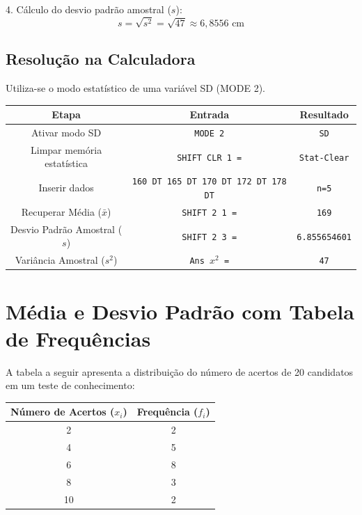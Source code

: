 4. Cálculo do desvio padrão amostral ($s$):
\[
s = \sqrt{s^2} = \sqrt{47} \approx 6{,}8556 \text{ cm}
\]

\subsection*{Resolução na Calculadora}

Utiliza-se o modo estatístico de uma variável SD (MODE 2).

\begin{table}[H]
    \centering
    \begin{tabular}{|c|c|c|}
        \hline
        \textbf{Etapa} & \textbf{Entrada} & \textbf{Resultado} \\ \hline
        Ativar modo SD & \texttt{MODE 2} & \texttt{SD} \\
        Limpar memória estatística & \texttt{SHIFT CLR 1 =} & \texttt{Stat-Clear} \\
        Inserir dados & \texttt{160 DT 165 DT 170 DT 172 DT 178 DT} & \texttt{n=5} \\
        Recuperar Média ($\bar{x}$) & \texttt{SHIFT 2 1 =} & \texttt{169} \\
        Desvio Padrão Amostral ($s$) & \texttt{SHIFT 2 3 =} & \texttt{6.855654601} \\
        Variância Amostral ($s^2$) & \texttt{Ans $x^2$ =} & \texttt{47} \\ \hline
    \end{tabular}
\end{table}

\section{Média e Desvio Padrão com Tabela de Frequências}

A tabela a seguir apresenta a distribuição do número de acertos de 20 candidatos em um teste de conhecimento:

\begin{table}[H]
    \centering
    \begin{tabular}{|c|c|}
        \hline
        \textbf{Número de Acertos ($x_i$)} & \textbf{Frequência ($f_i$)} \\ \hline
        2 & 2 \\
        4 & 5 \\
        6 & 8 \\
        8 & 3 \\
        10 & 2 \\ \hline
    \end{tabular}
    \label{tab:frequencias_exemplo}
\end{table}

